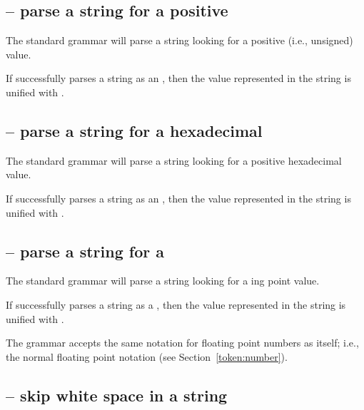 \subsection{ -- parse a string for a positive }
\label{stdparse:naturalOf}

The  standard grammar will parse a string looking for a positive (i.e., unsigned)  value.

If  successfully parses a string as an , then the value represented in the string is unified with .

\subsection{ -- parse a string for a hexadecimal }
\label{stdparse: hexNum}


The  standard grammar will parse a string looking for a positive hexadecimal value.

If  successfully parses a string as an , then the value represented in the string is unified with .

\subsection{ -- parse a string for a }
\label{stdparse:floatOf}


The  standard grammar will parse a string looking for a  ing point value.

If  successfully parses a string as a , then the value represented in the string is unified with .

The  grammar accepts the same notation for floating point numbers as \go itself; i.e., the normal floating point notation (see Section~\vref{token:number}).

\subsection{ -- skip white space in a string }
\label{stdparse:skipWhiteSpace}


